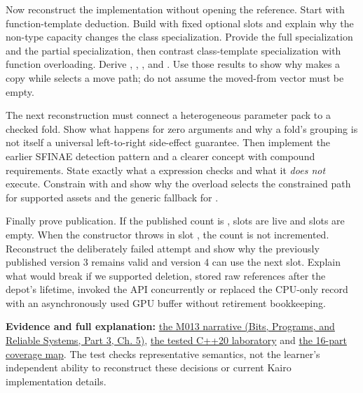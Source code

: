 Now reconstruct the implementation without opening the reference. Start with  function-template deduction. Build  with fixed optional slots and explain why the non-type capacity changes the class specialization. Provide the full  specialization and the partial  specialization, then contrast class-template specialization with function overloading. Derive , , , and . Use those results to show why  makes a copy while  selects a move path; do not assume the moved-from vector must be empty.

The next reconstruction must connect a heterogeneous parameter pack to a checked fold. Show what happens for zero arguments and why a fold's grouping is not itself a universal left-to-right side-effect guarantee. Then implement the earlier  SFINAE detection pattern and a clearer  concept with compound requirements. State exactly what a  expression checks and what it \emph{does not} execute. Constrain  with  and show why the overload  selects the constrained path for supported assets and the generic fallback for .

Finally prove publication. If the published count is , slots \BookInlineCode{{[}0,c)} are live and slots \BookInlineCode{{[}c,Capacity)} are empty. When the constructor throws in slot , the count is not incremented. Reconstruct the deliberately failed  attempt and show why the previously published version 3 remains valid and version 4 can use the next slot. Explain what would break if we supported deletion, stored raw references after the depot's lifetime, invoked the API concurrently or replaced the CPU-only record with an asynchronously used GPU buffer without retirement bookkeeping.

\textbf{Evidence and full explanation:} \href{../01-Bits-Programs-and-Reliable-Systems-P03/main.pdf\#nameddest=01-foundations-i-ch005-one-asset-pipeline-many-asset-types-generic-code-without-accidental-promises}{the M013 narrative (Bits, Programs, and Reliable Systems, Part 3, Ch. 5)}, \hyperref[source-file-a5db53514d74ae247b4ac42f]{the tested C++20 laboratory} and \hyperref[appendix-fd090d982a15-m013-parts-201216-generic-asset-preparation-with-constrained-apis]{the 16-part coverage map}. The test checks representative semantics, not the learner's independent ability to reconstruct these decisions or current Kairo implementation details.


